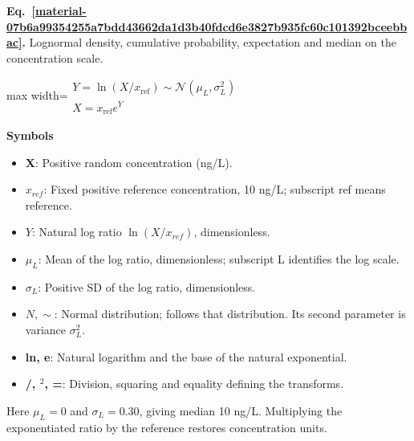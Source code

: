 \documentclass[11pt,a4paper]{article}
\begin{document}
\par\medskip
\noindent\begin{minipage}{\linewidth}
\label{material-07b6a99354255a7bdd43662da1d3b40fdcd6e3827b935fc60c101392bceebbac}
\noindent\textbf{Eq.~\ref*{material-07b6a99354255a7bdd43662da1d3b40fdcd6e3827b935fc60c101392bceebbac}.} Lognormal density, cumulative probability, expectation and median on the concentration scale.\par\nopagebreak
\begin{center}\begin{adjustbox}{max width=\linewidth}$\displaystyle \begin{gathered}Y=\ln(X/x_{\mathrm{ref}})\sim\mathcal N(\mu_L,\sigma_L^2)\\X=x_{\mathrm{ref}}e^Y\end{gathered}$\end{adjustbox}\end{center}

\par\noindent\textbf{Symbols}

\begin{itemize}\setlength{\itemsep}{1pt}\setlength{\parsep}{0pt}
\item \textbf{X}: Positive random concentration (ng/L).
\item \textbf{\(x_{ref}\)}: Fixed positive reference concentration, 10 ng/L; subscript ref means reference.
\item \textbf{\(Y\)}: Natural log ratio \(\ln(X / x_{ref})\), dimensionless.
\item \textbf{\(μ_L\)}: Mean of the log ratio, dimensionless; subscript L identifies the log scale.
\item \textbf{\(σ_L\)}: Positive SD of the log ratio, dimensionless.
\item \textbf{\(N, ∼\)}: Normal distribution; follows that distribution. Its second parameter is variance \(σ_L^2\).
\item \textbf{ln, e}: Natural logarithm and the base of the natural exponential.
\item \textbf{/, \ensuremath{{}^2}, =}: Division, squaring and equality defining the transforms.
\end{itemize}

Here \(μ_L = 0\) and \(σ_L = 0.30\), giving median 10 ng/L. Multiplying the exponentiated ratio by the reference restores concentration units.

\end{minipage}\par
\medskip
\end{document}
